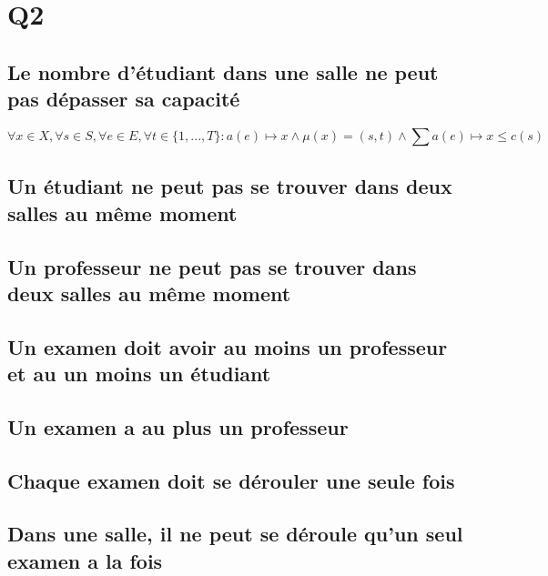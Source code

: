 \documentclass[a4paper,10pt]{article}
\begin{document}
\section{Q2}
\subsection {Le nombre d'étudiant dans une salle ne peut pas dépasser sa capacité}
\begin{displaymath}
\forall x \in X , \forall s \in S ,\forall e \in E, \forall t \in \{1,...,T\} : a(e) \mapsto {x} \wedge \mu(x) = (s,t) \wedge \sum a(e) \mapsto {x} \leq c(s)
\end{displaymath}	

\subsection {Un étudiant ne peut pas se trouver dans deux salles au même moment}

\subsection {Un professeur ne peut pas se trouver dans deux salles au même moment}

\subsection {Un examen doit avoir au moins un professeur et au un moins un étudiant}

\subsection {Un examen a au plus un professeur}

\subsection {Chaque examen doit se dérouler une seule fois}

\subsection {Dans une salle, il ne peut se déroule qu'un seul examen a la fois}
\end{document}
